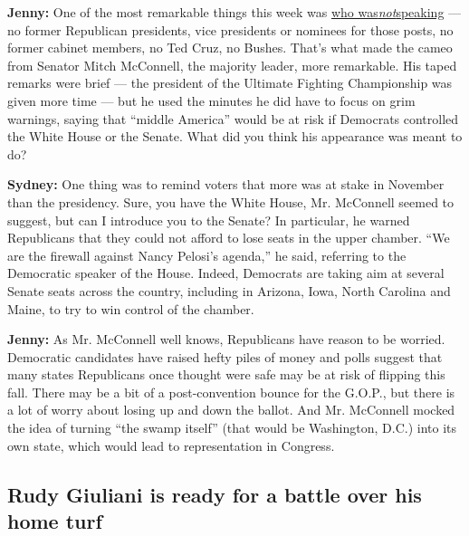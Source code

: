 \textbf{Jenny:} One of the most remarkable things this week was
\href{https://www.nytimes3xbfgragh.onion/2020/08/27/us/politics/trump-rnc-missing-former-presidents.html}{who
was}\href{https://www.nytimes3xbfgragh.onion/2020/08/27/us/politics/trump-rnc-missing-former-presidents.html}{\emph{not}}\href{https://www.nytimes3xbfgragh.onion/2020/08/27/us/politics/trump-rnc-missing-former-presidents.html}{speaking}
--- no former Republican presidents, vice presidents or nominees for
those posts, no former cabinet members, no Ted Cruz, no Bushes. That's
what made the cameo from Senator Mitch McConnell, the majority leader,
more remarkable. His taped remarks were brief --- the president of the
Ultimate Fighting Championship was given more time --- but he used the
minutes he did have to focus on grim warnings, saying that ``middle
America'' would be at risk if Democrats controlled the White House or
the Senate. What did you think his appearance was meant to do?

\textbf{Sydney:} One thing was to remind voters that more was at stake
in November than the presidency. Sure, you have the White House, Mr.
McConnell seemed to suggest, but can I introduce you to the Senate? In
particular, he warned Republicans that they could not afford to lose
seats in the upper chamber. ``We are the firewall against Nancy Pelosi's
agenda,'' he said, referring to the Democratic speaker of the House.
Indeed, Democrats are taking aim at several Senate seats across the
country, including in Arizona, Iowa, North Carolina and Maine, to try to
win control of the chamber.

\textbf{Jenny:} As Mr. McConnell well knows, Republicans have reason to
be worried. Democratic candidates have raised hefty piles of money and
polls suggest that many states Republicans once thought were safe may be
at risk of flipping this fall. There may be a bit of a post-convention
bounce for the G.O.P., but there is a lot of worry about losing up and
down the ballot. And Mr. McConnell mocked the idea of turning ``the
swamp itself'' (that would be Washington, D.C.) into its own state,
which would lead to representation in Congress.

\hypertarget{rudy-giuliani-is-ready-for-a-battle-over-his-home-turf}{%
\subsection{Rudy Giuliani is ready for a battle over his home
turf}\label{rudy-giuliani-is-ready-for-a-battle-over-his-home-turf}}

